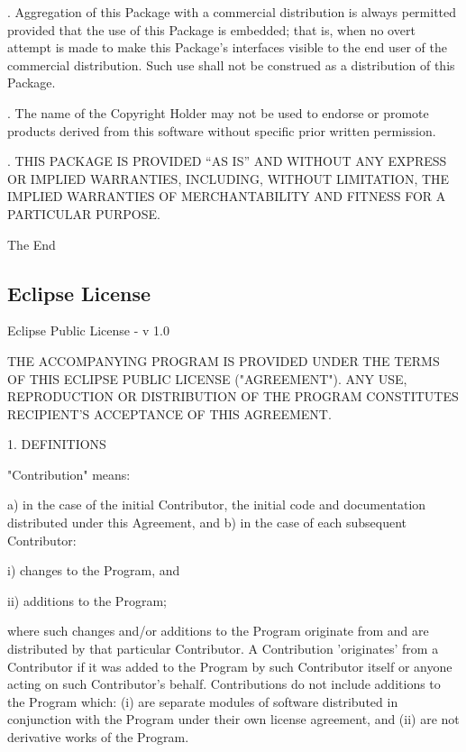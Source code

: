 \documentclass[10pt,letterpaper,titlepage]{article}
\begin{document}
. Aggregation of this Package with a commercial distribution is always permitted provided that the use of this Package is embedded; that is, when no overt attempt is made to make this Package's interfaces visible to the end user of the commercial distribution.  Such use shall not be construed as a distribution of this Package.
\vspace{8pt}

. The name of the Copyright Holder may not be used to endorse or promote products derived from this software without specific prior written permission.
\vspace{2pt}

. THIS PACKAGE IS PROVIDED ``AS IS'' AND WITHOUT ANY EXPRESS OR IMPLIED WARRANTIES, INCLUDING, WITHOUT LIMITATION, THE IMPLIED WARRANTIES OF MERCHANTABILITY AND FITNESS FOR A PARTICULAR PURPOSE.

\begin{center}
The End
\end{center}

\subsection{Eclipse License}

Eclipse Public License - v 1.0

THE ACCOMPANYING PROGRAM IS PROVIDED UNDER THE TERMS OF THIS ECLIPSE PUBLIC LICENSE ("AGREEMENT"). ANY USE, REPRODUCTION OR DISTRIBUTION OF THE PROGRAM CONSTITUTES RECIPIENT'S ACCEPTANCE OF THIS AGREEMENT.

1. DEFINITIONS

"Contribution" means:

a) in the case of the initial Contributor, the initial code and documentation distributed under this Agreement, and
b) in the case of each subsequent Contributor:

i) changes to the Program, and

ii) additions to the Program;

where such changes and/or additions to the Program originate from and are distributed by that particular Contributor. A Contribution 'originates' from a Contributor if it was added to the Program by such Contributor itself or anyone acting on such Contributor's behalf. Contributions do not include additions to the Program which: (i) are separate modules of software distributed in conjunction with the Program under their own license agreement, and (ii) are not derivative works of the Program.
\end{document}
